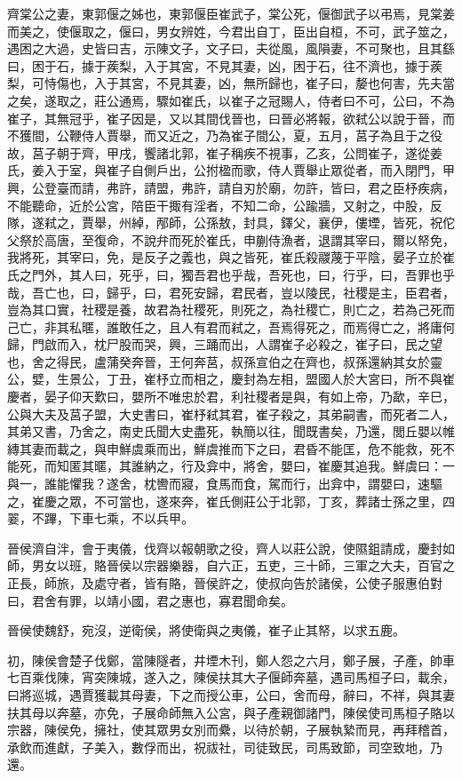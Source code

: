 \begin{pinyinscope}
齊棠公之妻，東郭偃之姊也，東郭偃臣崔武子，棠公死，偃御武子以弔焉，見棠姜而美之，使偃取之，偃曰，男女辨姓，今君出自丁，臣出自桓，不可，武子筮之，遇困之大過，史皆曰吉，示陳文子，文子曰，夫從風，風隕妻，不可聚也，且其繇曰，困于石，據于蒺梨，入于其宮，不見其妻，凶，困于石，往不濟也，據于蒺梨，可恃傷也，入于其宮，不見其妻，凶，無所歸也，崔子曰，嫠也何害，先夫當之矣，遂取之，莊公通焉，驟如崔氏，以崔子之冠賜人，侍者曰不可，公曰，不為崔子，其無冠乎，崔子因是，又以其間伐晉也，曰晉必將報，欲弒公以說于晉，而不獲間，公鞭侍人賈舉，而又近之，乃為崔子間公，夏，五月，莒子為且于之役故，莒子朝于齊，甲戌，饗諸北郭，崔子稱疾不視事，乙亥，公問崔子，遂從姜氏，姜入于室，與崔子自側戶出，公拊楹而歌，侍人賈舉止眾從者，而入閉門，甲興，公登臺而請，弗許，請盟，弗許，請自刃於廟，勿許，皆曰，君之臣杼疾病，不能聽命，近於公宮，陪臣干掫有淫者，不知二命，公踰牆，又射之，中股，反隊，遂弒之，賈舉，州綽，邴師，公孫敖，封具，鐸父，襄伊，僂堙，皆死，祝佗父祭於高唐，至復命，不說弁而死於崔氏，申蒯侍漁者，退謂其宰曰，爾以帑免，我將死，其宰曰，免，是反子之義也，與之皆死，崔氏殺鬷蔑于平陰，晏子立於崔氏之門外，其人曰，死乎，曰，獨吾君也乎哉，吾死也，曰，行乎，曰，吾罪也乎哉，吾亡也，曰，歸乎，曰，君死安歸，君民者，豈以陵民，社稷是主，臣君者，豈為其口實，社稷是養，故君為社稷死，則死之，為社稷亡，則亡之，若為己死而己亡，非其私暱，誰敢任之，且人有君而弒之，吾焉得死之，而焉得亡之，將庸何歸，門啟而入，枕尸股而哭，興，三踊而出，人謂崔子必殺之，崔子曰，民之望也，舍之得民，盧蒲癸奔晉，王何奔莒，叔孫宣伯之在齊也，叔孫還納其女於靈公，嬖，生景公，丁丑，崔杼立而相之，慶封為左相，盟國人於大宮曰，所不與崔慶者，晏子仰天歎曰，嬰所不唯忠於君，利社稷者是與，有如上帝，乃歃，辛巳，公與大夫及莒子盟，大史書曰，崔杼弒其君，崔子殺之，其弟嗣書，而死者二人，其弟又書，乃舍之，南史氏聞大史盡死，執簡以往，聞既書矣，乃還，閭丘嬰以帷縳其妻而載之，與申鮮虞乘而出，鮮虞推而下之曰，君昏不能匡，危不能救，死不能死，而知匿其暱，其誰納之，行及弇中，將舍，嬰曰，崔慶其追我。鮮虞曰：一與一，誰能懼我？遂舍，枕轡而寢，食馬而食，駕而行，出弇中，謂嬰曰，速驅之，崔慶之眾，不可當也，遂來奔，崔氏側莊公于北郭，丁亥，葬諸士孫之里，四翣，不蹕，下車七乘，不以兵甲。

晉侯濟自泮，會于夷儀，伐齊以報朝歌之役，齊人以莊公說，使隰鉏請成，慶封如師，男女以班，賂晉侯以宗器樂器，自六正，五吏，三十師，三軍之大夫，百官之正長，師旅，及處守者，皆有賂，晉侯許之，使叔向告於諸侯，公使子服惠伯對曰，君舍有罪，以靖小國，君之惠也，寡君聞命矣。

晉侯使魏舒，宛沒，逆衛侯，將使衛與之夷儀，崔子止其帑，以求五鹿。

初，陳侯會楚子伐鄭，當陳隧者，井堙木刊，鄭人怨之六月，鄭子展，子產，帥車七百乘伐陳，宵突陳城，遂入之，陳侯扶其大子偃師奔墓，遇司馬桓子曰，載余，曰將巡城，遇賈獲載其母妻，下之而授公車，公曰，舍而母，辭曰，不祥，與其妻扶其母以奔墓，亦免，子展命師無入公宮，與子產親御諸門，陳侯使司馬桓子賂以宗器，陳侯免，擁社，使其眾男女別而纍，以待於朝，子展執縶而見，再拜稽首，承飲而進獻，子美入，數俘而出，祝祓社，司徒致民，司馬致節，司空致地，乃還。


\end{pinyinscope}
